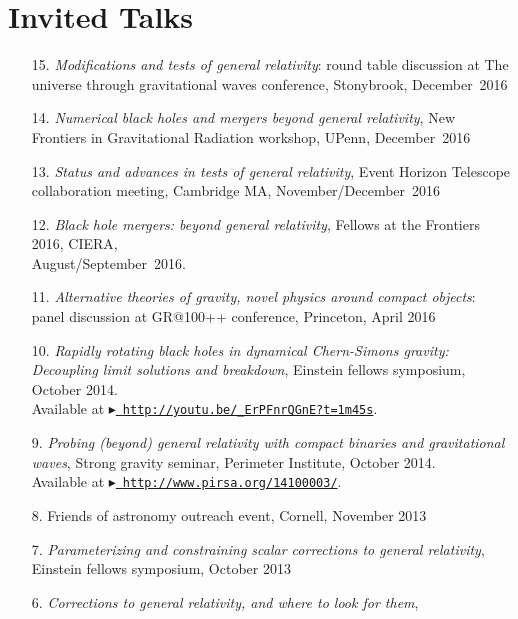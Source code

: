 \newcommand{\playsymbol}{$\blacktriangleright$}
\section{\sc Invited Talks}
\begin{enumerate}
\item[{15.}] {\it Modifications and tests of general relativity}:
  round table discussion at
  The universe through gravitational waves conference,
  Stonybrook, December~2016
\item[{14.}] {\it Numerical black holes and mergers beyond general relativity},
  New Frontiers in Gravitational Radiation workshop, UPenn, December~2016
\item[{13.}] {\it Status and advances in tests of general relativity},
  Event Horizon Telescope collaboration meeting, Cambridge MA,
  November/December~2016
\item[{12.}] {\it Black hole mergers: beyond general relativity},
  Fellows at the Frontiers 2016, CIERA,\\ August/September~2016.
\item[{11.}] {\it Alternative theories of gravity, novel physics
    around compact objects}: panel discussion at GR@100++ conference,
  Princeton, April 2016
\item[{10.}] {\it Rapidly rotating black holes in dynamical Chern-Simons gravity:
    Decoupling limit solutions and breakdown},
 Einstein fellows symposium, October 2014.\\
 Available at \href{http://youtu.be/_ErPFnrQGnE?t=1m45s}{\playsymbol~\texttt{http://youtu.be/\_ErPFnrQGnE?t=1m45s}}.
\item[{9.}] {\it Probing (beyond) general relativity with compact binaries and
    gravitational waves},
  Strong gravity seminar, Perimeter Institute, October 2014.\\
  Available at \href{http://www.pirsa.org/14100003/}{\playsymbol~\texttt{http://www.pirsa.org/14100003/}}.
\item[{8.}]
  Friends of astronomy outreach event, Cornell, November 2013
\item[{7.}] {\it Parameterizing and constraining scalar corrections to general relativity},
  Einstein fellows symposium, October 2013
\item[{6.}] {\it Corrections to general relativity, and where to look for them},

\end{enumerate}
